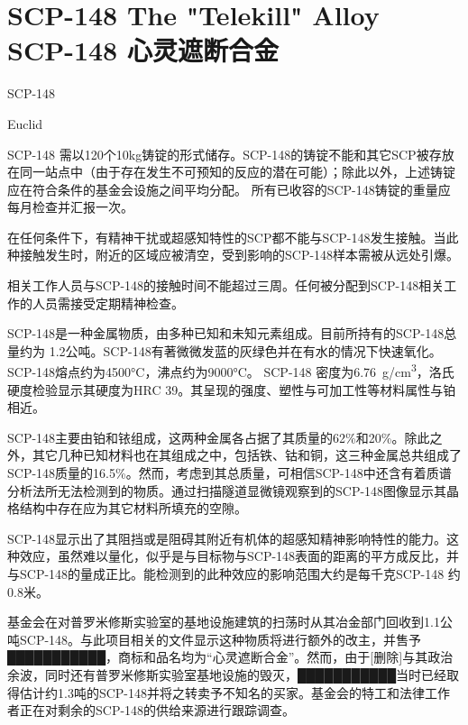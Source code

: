 \chapter[SCP-148 心灵遮断合金]{
    SCP-148 The "Telekill" Alloy\\
    SCP-148 心灵遮断合金
}

\label{chap:SCP-148}

SCP-148

Euclid



SCP-148 需以120个10kg铸锭的形式储存。SCP-148的铸锭不能和其它SCP被存放在同一站点中（由于存在发生不可预知的反应的潜在可能）；除此以外，上述铸锭应在符合条件的基金会设施之间平均分配。 所有已收容的SCP-148铸锭的重量应每月检查并汇报一次。

在任何条件下，有精神干扰或超感知特性的SCP都不能与SCP-148发生接触。当此种接触发生时，附近的区域应被清空，受到影响的SCP-148样本需被从远处引爆。

相关工作人员与SCP-148的接触时间不能超过三周。任何被分配到SCP-148相关工作的人员需接受定期精神检查。

 SCP-148是一种金属物质，由多种已知和未知元素组成。目前所持有的SCP-148总量约为 1.2公吨。SCP-148有著微微发蓝的灰绿色并在有水的情况下快速氧化。 SCP-148熔点约为4500°C，沸点约为9000°C。 SCP-148 密度为6.76 g\slash cm\textsuperscript{3}，洛氏硬度检验显示其硬度为HRC 39。其呈现的强度、塑性与可加工性等材料属性与铂相近。

SCP-148主要由铂和铱组成，这两种金属各占据了其质量的62\%和20\%。除此之外，其它几种已知材料也在其组成之中，包括铁、钴和铜，这三种金属总共组成了SCP-148质量的16.5\%。然而，考虑到其总质量，可相信SCP-148中还含有着质谱分析法所无法检测到的物质。通过扫描隧道显微镜观察到的SCP-148图像显示其晶格结构中存在应为其它材料所填充的空隙。

SCP-148显示出了其阻挡或是阻碍其附近有机体的超感知精神影响特性的能力。这种效应，虽然难以量化，似乎是与目标物与SCP-148表面的距离的平方成反比，并与SCP-148的量成正比。能检测到的此种效应的影响范围大约是每千克SCP-148 约0.8米。

基金会在对普罗米修斯实验室的基地设施建筑的扫荡时从其冶金部门回收到1.1公吨SCP-148。与此项目相关的文件显示这种物质将进行额外的改主，并售予███████████，商标和品名均为“心灵遮断合金”。然而，由于{[}删除]与其政治余波，同时还有普罗米修斯实验室基地设施的毁灭，███████████当时已经取得估计约1.3吨的SCP-148并将之转卖予不知名的买家。基金会的特工和法律工作者正在对剩余的SCP-148的供给来源进行跟踪调查。

